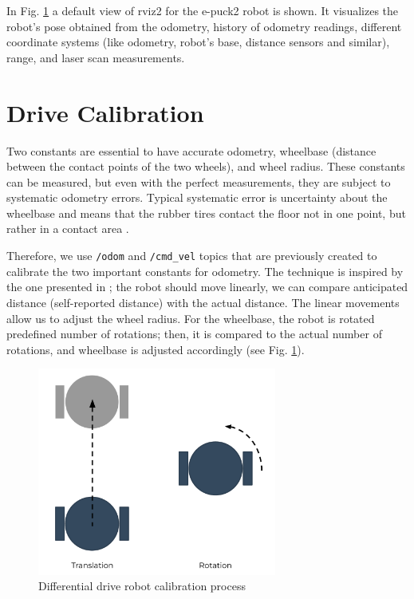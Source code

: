 In Fig. \ref{fig:demos:rviz} a default view of \acs{rviz2} for the e-puck2 robot is shown.
It visualizes the robot's pose obtained from the odometry, history of odometry readings, different coordinate systems (like odometry, robot's base, distance sensors and similar), range, and laser scan measurements.

\section{Drive Calibration}

Two constants are essential to have accurate odometry, wheelbase (distance between the contact points of the two wheels), and wheel radius.
These constants can be measured, but even with the perfect measurements, they are subject to systematic odometry errors. 
Typical systematic error is uncertainty about the wheelbase and means that the rubber tires contact the floor not in one point, but rather in a contact area \cite{borenstein_measurement_1996}.

Therefore, we use \texttt{/odom} and \texttt{/cmd\_vel} topics that are previously created to calibrate the two important constants for odometry.
The technique is inspired by the one presented in \cite{borenstein_measurement_1996}; the robot should move linearly, we can compare anticipated distance (self-reported distance) with the actual distance.
The linear movements allow us to adjust the wheel radius.
For the wheelbase, the robot is rotated predefined number of rotations; then, it is compared to the actual number of rotations, and wheelbase is adjusted accordingly (see Fig. \ref{fig:demos:rviz}).

\begin{figure}[H]
    \centering
    \includegraphics[width=0.7\textwidth]{demos/figures/calibration.pdf}
    \caption{Differential drive robot calibration process}
    \label{fig:demos:rviz}
\end{figure}


